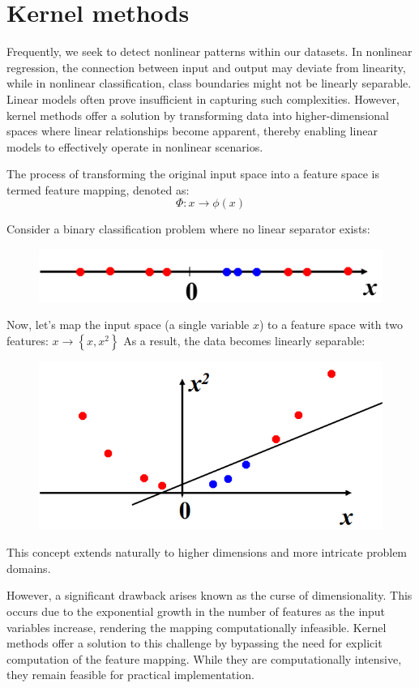 \section{Kernel methods}

Frequently, we seek to detect nonlinear patterns within our datasets. 
In nonlinear regression, the connection between input and output may deviate from linearity, while in nonlinear classification, class boundaries might not be linearly separable. 
Linear models often prove insufficient in capturing such complexities. 
However, kernel methods offer a solution by transforming data into higher-dimensional spaces where linear relationships become apparent, thereby enabling linear models to effectively operate in nonlinear scenarios.

The process of transforming the original input space into a feature space is termed feature mapping, denoted as:
\[\Phi:x\rightarrow\phi(x)\]

\begin{example}
    Consider a binary classification problem where no linear separator exists:
    \begin{figure}[H]
        \centering
        \includegraphics[width=0.5\linewidth]{images/ker1.png}
    \end{figure}
    Now, let's map the input space (a single variable $x$) to a feature space with two features: $x\rightarrow\left\{ x,x^2 \right\}$
    As a result, the data becomes linearly separable:
    \begin{figure}[H]
        \centering
        \includegraphics[width=0.5\linewidth]{images/ker2.png}
    \end{figure}
\end{example}
This concept extends naturally to higher dimensions and more intricate problem domains.

However, a significant drawback arises known as the curse of dimensionality. 
This occurs due to the exponential growth in the number of features as the input variables increase, rendering the mapping computationally infeasible.
Kernel methods offer a solution to this challenge by bypassing the need for explicit computation of the feature mapping.
While they are computationally intensive, they remain feasible for practical implementation.

